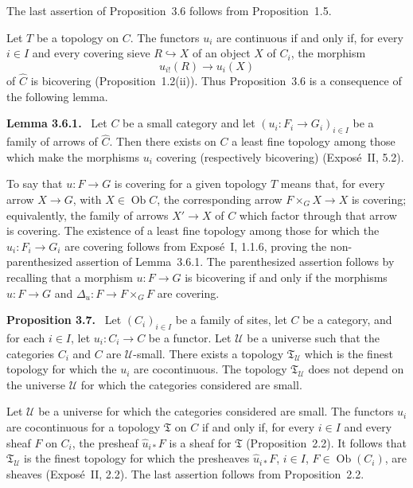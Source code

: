 \documentclass[11pt]{article}
\newcommand{\U}{\mathcal{U}}
\newcommand{\Ob}{\operatorname{Ob}}
\newenvironment{statement}[1]{\par\medskip\noindent\textbf{#1.}\ }{\par\medskip}
\begin{document}
The last assertion of Proposition~3.6 follows from Proposition~1.5.

Let \(T\) be a topology on \(C\). The functors \(u_i\) are continuous if and only if, for every \(i\in I\) and every covering sieve \(R\hookrightarrow X\) of an object \(X\) of \(C_i\), the morphism
\[
u_{i!}(R)\to u_i(X)
\]
of \(\widehat C\) is bicov\-ering (Proposition~1.2(ii)). Thus Proposition~3.6 is a consequence of the following lemma.

\begin{statement}{Lemma 3.6.1}
Let \(C\) be a small category and let \((u_i:F_i\to G_i)_{i\in I}\) be a family of arrows of \(\widehat C\). Then there exists on \(C\) a least fine topology among those which make the morphisms \(u_i\) covering (respectively bicov\-ering) (Expos\'e~II, 5.2).
\end{statement}

To say that \(u:F\to G\) is covering for a given topology \(T\) means that, for every arrow \(X\to G\), with \(X\in\Ob C\), the corresponding arrow \(F\times_GX\to X\) is covering; equivalently, the family of arrows \(X'\to X\) of \(C\) which factor through that arrow is covering. The existence of a least fine topology among those for which the \(u_i:F_i\to G_i\) are covering follows from Expos\'e~I, 1.1.6, proving the non-parenthesized assertion of Lemma~3.6.1. The parenthesized assertion follows by recalling that a morphism \(u:F\to G\) is bicov\-ering if and only if the morphisms \(u:F\to G\) and \(\Delta_u:F\to F\times_GF\) are covering.

\begin{statement}{Proposition 3.7}
Let \((C_i)_{i\in I}\) be a family of sites, let \(C\) be a category, and for each \(i\in I\), let \(u_i:C_i\to C\) be a functor. Let \(\U\) be a universe such that the categories \(C_i\) and \(C\) are \(\U\)-small. There exists a topology \(\mathfrak T_{\U}\) which is the finest topology for which the \(u_i\) are cocontinuous. The topology \(\mathfrak T_{\U}\) does not depend on the universe \(\U\) for which the categories considered are small.
\end{statement}

Let \(\U\) be a universe for which the categories considered are small. The functors \(u_i\) are cocontinuous for a topology \(\mathfrak T\) on \(C\) if and only if, for every \(i\in I\) and every sheaf \(F\) on \(C_i\), the presheaf \(\widehat u_{i\ast}F\) is a sheaf for \(\mathfrak T\) (Proposition~2.2). It follows that \(\mathfrak T_{\U}\) is the finest topology for which the presheaves \(\widehat u_{i\ast}F\), \(i\in I\), \(F\in\Ob(C_i)\), are sheaves (Expos\'e~II, 2.2). The last assertion follows from Proposition~2.2.
\end{document}
